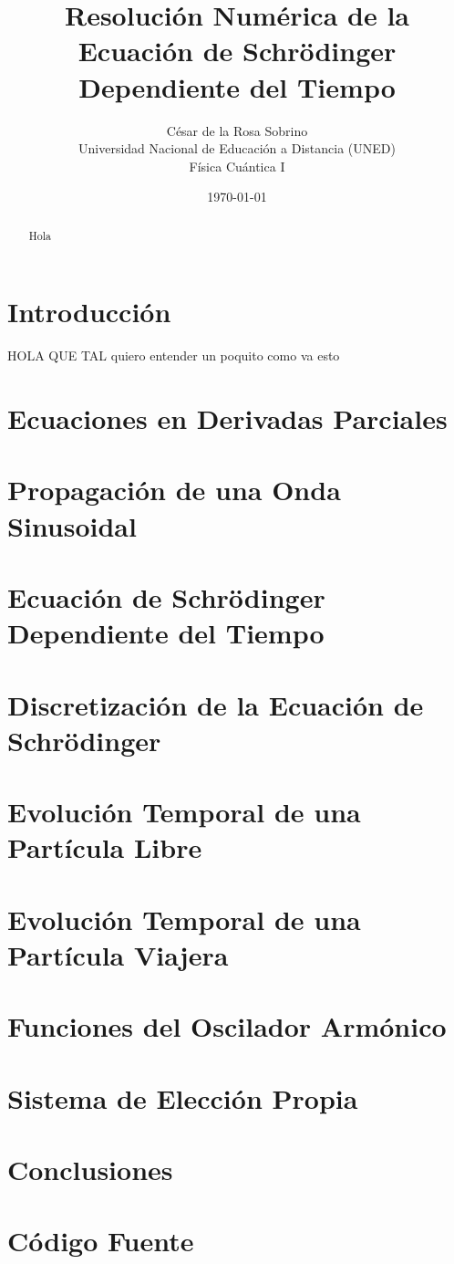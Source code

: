 \documentclass[a4paper, 12pt, twocolumn]{article}
\title{Resolución Numérica de la Ecuación de Schrödinger Dependiente del Tiempo}
\author{
	César de la Rosa Sobrino \\
	Universidad Nacional de Educación a Distancia (UNED) \\
	Física Cuántica I
}
\date{\today}
\begin{document}
\maketitle

\begin{abstract}
	Hola
\end{abstract}

\twocolumn

\section{Introducción}

HOLA QUE TAL quiero entender un poquito como va esto
\section{Ecuaciones en Derivadas Parciales}


\section{Propagación de una Onda Sinusoidal}


\section{Ecuación de Schrödinger Dependiente del Tiempo}


\section{Discretización de la Ecuación de Schrödinger}


\section{Evolución Temporal de una Partícula Libre}


\section{Evolución Temporal de una Partícula Viajera}


\section{Funciones del Oscilador Armónico}


\section{Sistema de Elección Propia}


\section{Conclusiones}





\appendix
\section{Código Fuente}

\end{document}

